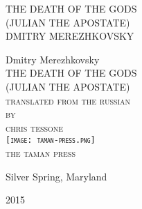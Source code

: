 \newlength{\drop}\setlength{\drop}{0.12\textheight}

\newcommand*{\firsttitle}{\begingroup
\centering
\vspace*{3em}
{\Large THE DEATH OF THE GODS}\\[\baselineskip]
{\Large (JULIAN THE APOSTATE)}\\[\baselineskip]
{\Large DMITRY MEREZHKOVSKY}
\vfill\null
\endgroup}

\newcommand*{\titleAM}{\begingroup
\centering
\vspace*{\drop}
{\large Dmitry Merezhkovsky}\\[\baselineskip]
{\Huge THE DEATH OF THE GODS}\\[\baselineskip]
{\Huge (JULIAN THE APOSTATE)}\\[\baselineskip]
{\scshape translated from the russian}\\
{\scshape by}\\
{\scshape chris tessone}\\
\vfill%
{\scshape \texttt{[image: taman-press.png]}}\\[0.5\baselineskip]
{\small\scshape the taman press}\par
{\small Silver Spring, Maryland}\par
{\small\scshape 2015}\par
\endgroup}

\firsttitle
\thispagestyle{empty}
\clearpage

\newpage\null\thispagestyle{empty}\newpage

\titleAM
\thispagestyle{empty}
\clearpage 
